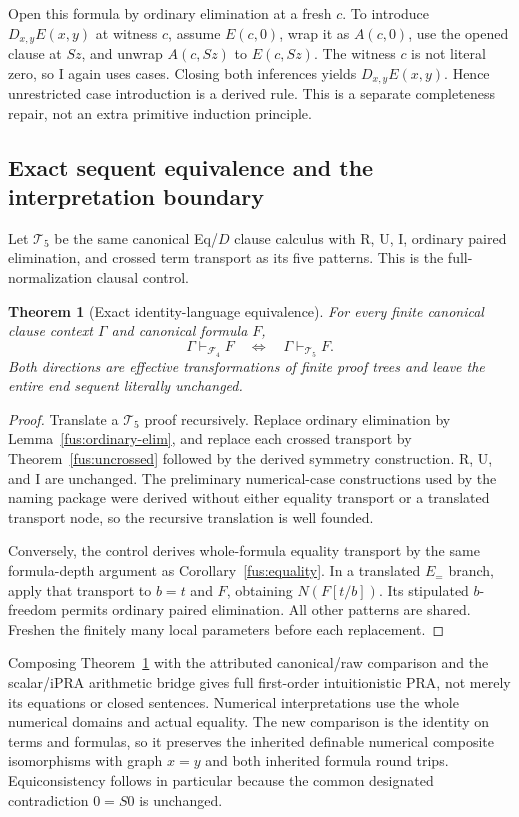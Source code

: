 \documentclass[11pt,letterpaper]{article}
\newtheorem{theorem}{Theorem}[section]
\theoremstyle{definition}\newtheorem{definition}[theorem]{Definition}
\theoremstyle{remark}\newtheorem{remark}[theorem]{Remark}
\begin{document}
Open this formula by ordinary elimination at a fresh $c$. To introduce
$D_{x,y}E(x,y)$ at witness $c$, assume $E(c,0)$, wrap it as $A(c,0)$,
use the opened clause at $Sz$, and unwrap $A(c,Sz)$ to $E(c,Sz)$.
The witness $c$ is not literal zero, so I again uses cases. Closing both
inferences yields $D_{x,y}E(x,y)$. Hence unrestricted case introduction
is a derived rule. This is a separate completeness repair, not an extra
primitive induction principle.

\subsection{Exact sequent equivalence and the interpretation boundary}

Let $\mathcal T_5$ be the same canonical Eq/$D$ clause calculus with R, U,
I, ordinary paired elimination, and crossed term transport as its five
patterns. This is the full-normalization clausal control.

\begin{theorem}[Exact identity-language equivalence]
\label{fus:equivalence}
For every finite canonical clause context $\Gamma$ and canonical formula $F$,
\[
 \Gamma\vdash_{\mathcal F_4}F
 \quad\Longleftrightarrow\quad
 \Gamma\vdash_{\mathcal T_5}F.
\]
Both directions are effective transformations of finite proof trees and
leave the entire end sequent literally unchanged.
\end{theorem}
\begin{proof}
Translate a $\mathcal T_5$ proof recursively. Replace ordinary elimination
by Lemma~\ref{fus:ordinary-elim}, and replace each crossed transport by
Theorem~\ref{fus:uncrossed} followed by the derived symmetry construction.
R, U, and I are unchanged. The preliminary numerical-case constructions
used by the naming package were derived without either equality transport
or a translated transport node, so the recursive translation is well founded.

Conversely, the control derives whole-formula equality transport by the
same formula-depth argument as Corollary~\ref{fus:equality}. In a translated
$E_{=}$ branch, apply that transport to $b=t$ and $F$, obtaining
$N(F[t/b])$. Its stipulated $b$-freedom permits ordinary paired elimination.
All other patterns are shared. Freshen the finitely many local parameters
before each replacement.
\end{proof}

Composing Theorem~\ref{fus:equivalence} with the attributed canonical/raw
comparison and the scalar/iPRA arithmetic bridge gives full first-order
intuitionistic PRA, not merely its equations or closed sentences. Numerical
interpretations use the whole numerical domains and actual equality. The
new comparison is the identity on terms and formulas, so it preserves the
inherited definable numerical composite isomorphisms with graph $x=y$ and
both inherited formula round trips. Equiconsistency follows in particular
because the common designated contradiction $0=S0$ is unchanged.
\end{document}
